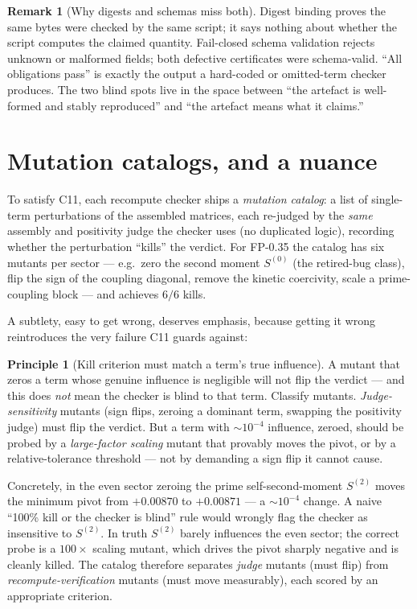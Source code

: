 \documentclass[11pt,a4paper]{amsart}
\theoremstyle{plain}
\theoremstyle{definition}
\newtheorem{principle}[theorem]{Principle}
\newtheorem{remark}[theorem]{Remark}
\newcommand{\CelevenA}{\textsf{C11}}
\begin{document}
\begin{remark}[Why digests and schemas miss both]
Digest binding proves the same bytes were checked by the same script; it says
nothing about whether the script computes the claimed quantity. Fail-closed
schema validation rejects unknown or malformed fields; both defective
certificates were schema-valid. ``All obligations pass'' is exactly the output a
hard-coded or omitted-term checker produces. The two blind spots live in the
space between ``the artefact is well-formed and stably reproduced'' and ``the
artefact means what it claims.''
\end{remark}

\section{Mutation catalogs, and a nuance}
\label{sec:mutation}

To satisfy \CelevenA{}, each recompute checker ships a \emph{mutation catalog}: a
list of single-term perturbations of the assembled matrices, each re-judged by
the \emph{same} assembly and positivity judge the checker uses (no duplicated
logic), recording whether the perturbation ``kills'' the verdict. For FP-0.35 the
catalog has six mutants per sector --- e.g.\ zero the second moment $S^{(0)}$
(the retired-bug class), flip the sign of the coupling diagonal, remove the
kinetic coercivity, scale a prime-coupling block --- and achieves $6/6$ kills.

A subtlety, easy to get wrong, deserves emphasis, because getting it wrong
reintroduces the very failure \CelevenA{} guards against:

\begin{principle}[Kill criterion must match a term's true influence]
A mutant that zeros a term whose genuine influence is negligible will not flip
the verdict --- and this does \emph{not} mean the checker is blind to that term.
Classify mutants. \emph{Judge-sensitivity} mutants (sign flips, zeroing a
dominant term, swapping the positivity judge) must flip the verdict. But a term
with $\sim\!10^{-4}$ influence, zeroed, should be probed by a \emph{large-factor
scaling} mutant that provably moves the pivot, or by a relative-tolerance
threshold --- not by demanding a sign flip it cannot cause.
\end{principle}

Concretely, in the even sector zeroing the prime self-second-moment $S^{(2)}$
moves the minimum pivot from $+0.00870$ to $+0.00871$ --- a $\sim\!10^{-4}$
change. A naive ``100\% kill or the checker is blind'' rule would wrongly flag
the checker as insensitive to $S^{(2)}$. In truth $S^{(2)}$ barely influences the
even sector; the correct probe is a $100\times$ scaling mutant, which drives the
pivot sharply negative and is cleanly killed. The catalog therefore separates
\emph{judge} mutants (must flip) from \emph{recompute-verification} mutants (must
move measurably), each scored by an appropriate criterion.
\end{document}
